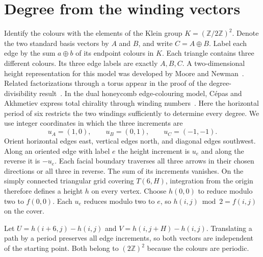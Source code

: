 \documentclass[11pt,a4paper]{article}
\newcommand{\Z}{\mathbb Z}
\begin{document}
\section{Degree from the winding vectors}

Identify the colours with the elements of the Klein group $K=(\Z/2\Z)^2$. Denote the two standard basis vectors by $A$ and $B$, and write $C=A\oplus B$. Label each edge by the sum $a\oplus b$ of its endpoint colours in $K$. Each triangle contains three different colours. Its three edge labels are exactly $A,B,C$. A two-dimensional height representation for this model was developed by Moore and Newman~\cite[Sec.~III]{mn}. Related factorizations through a torus appear in the proof of the degree-divisibility result~\cite[Prop.~3.2]{ms}. In the dual honeycomb edge-colouring model, C\'epas and Akhmetiev express total chirality through winding numbers~\cite[Sec.~4.1]{ca}. Here the horizontal period of six restricts the two windings sufficiently to determine every degree. We use integer coordinates in which the three increments are
\[
 u_A=(1,0),\qquad u_B=(0,1),\qquad u_C=(-1,-1).
\]
Orient horizontal edges east, vertical edges north, and diagonal edges southwest. Along an oriented edge with label $e$ the height increment is $u_e$ and along the reverse it is $-u_e$. Each facial boundary traverses all three arrows in their chosen directions or all three in reverse. The sum of its increments vanishes. On the simply connected triangular grid covering $T(6,H)$, integration from the origin therefore defines a height $h$ on every vertex. Choose $h(0,0)$ to reduce modulo two to $f(0,0)$. Each $u_e$ reduces modulo two to $e$, so $h(i,j)\bmod 2=f(i,j)$ on the cover.

Let $U=h(i+6,j)-h(i,j)$ and $V=h(i,j+H)-h(i,j)$. Translating a path by a period preserves all edge increments, so both vectors are independent of the starting point. Both belong to $(2\Z)^2$ because the colours are periodic.
\end{document}
